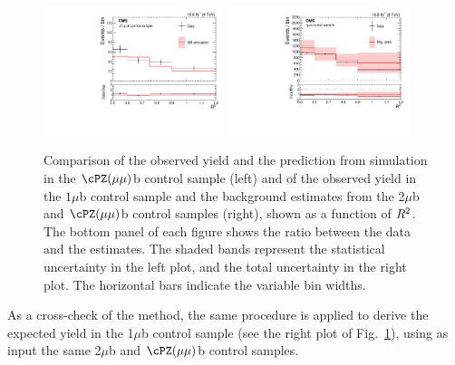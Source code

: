 \begin{figure}
\centering
   \includegraphics[width=0.47\textwidth]{BtagPlots/MC_CP_2Mu1LbZ_Sep.pdf}
   \includegraphics[width=0.47\textwidth]{BtagPlots/Closure_CP_1mu1Tb_SYS_Sep.pdf}
 \caption{Comparison of the observed yield and the
   prediction from simulation in the $\cPZ(\mu\mu)$b control sample (left)
   and of the observed yield in the $1\mu$b control sample and
   the background estimates from the 2$\mu$b and $\cPZ(\mu\mu)$b
   control samples (right), shown as a function of $R^2$. The bottom
   panel of each figure shows the ratio between the data and the
   estimates. The shaded bands represent the statistical uncertainty
   in the left plot, and the total uncertainty in the right plot. The horizontal bars indicate
the variable bin widths.\label{fig:Zmumub}}
\end{figure}
As a cross-check of the method, the same
procedure is applied to derive the expected yield in the 1$\mu$b
control sample (see the right plot of Fig.~\ref{fig:Zmumub}), using as input the same 2$\mu$b and $\cPZ(\mu\mu)$b
control samples.

